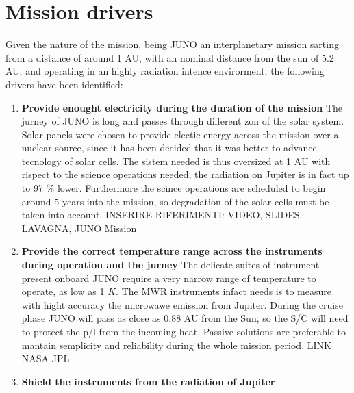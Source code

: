 \section{Mission drivers}
\label{sec:drivers}

Given the nature of the mission, being JUNO an interplanetary mission sarting from a distance of around 1 AU, with an nominal distance from the sun of 5.2 AU, and operating in an highly radiation 
intence envirorment, the following drivers have been identified: 

\begin{enumerate}[leftmargin=1.5em]
    \item \textbf{Provide enought electricity during the duration of the mission} 
    \newline The jurney of JUNO is long and passes through different zon of the solar system. Solar panels were chosen to provide 
    electic energy across the mission over a nuclear source, since it has been decided that it was better to advance tecnology
    of solar cells. The sistem needed is thus oversized at 1 AU with rispect to the science operations needed, the radiation on Jupiter is in fact up to 
    97 \% lower. Furthermore the scince operations are scheduled to begin around 5 years into the mission, so degradation of the solar cells 
    must be taken into account. INSERIRE RIFERIMENTI: VIDEO, SLIDES LAVAGNA, JUNO Mission
    \item \textbf{Provide the correct temperature range across the instruments during operation and the jurney}
    \newline The delicate suites of instrument present onboard JUNO require a very narrow range of temperature to operate, as 
    low as 1 $K$. The MWR instruments infact needs is to measure with hight accuracy the microwawe emission from Jupiter. During the cruise phase JUNO will
    pass as close as 0.88 AU from the Sun, so the S/C will need to protect the p/l from the incoming heat. Passive solutions are preferable to mantain semplicity 
    and reliability during the whole mission period. LINK NASA JPL
    \item \textbf{Shield the instruments from the radiation of Jupiter}
\end{enumerate}  